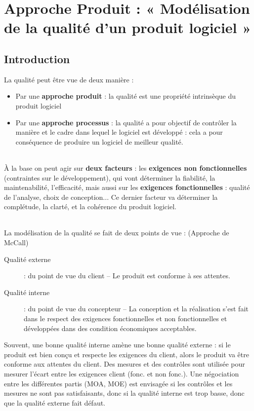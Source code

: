 \chapter{Approche Produit : « Modélisation de la qualité d’un produit logiciel »}

\section{Introduction}

La qualité peut être vue de deux manière :
\begin{itemize}
\item Par une \textbf{approche produit} : la qualité est une propriété intrinsèque du produit logiciel
\item Par une \textbf{approche processus} : la qualité a pour objectif de contrôler la manière et le cadre 	dans lequel le logiciel est développé : cela a pour conséquence de produire un logiciel de meilleur qualité.
\end{itemize}

\hfill\\

À la base on peut agir sur \textbf{deux facteurs} : les \textbf{exigences non fonctionnelles} (contraintes sur le développement), qui vont déterminer la fiabilité, la maintenabilité, l'efficacité, mais aussi sur les \textbf{exigences fonctionnelles} : qualité de l'analyse, choix de conception... Ce dernier facteur va déterminer la complétude, la clarté, et la cohérence du produit logiciel.

\hfill\\

La modélisation de la qualité se fait de deux points de vue : (Approche de McCall)
\begin{description}
\item[Qualité externe] : du point de vue du client – Le produit est conforme à ses attentes.
\item[Qualité interne] : du point  de vue du concepteur – La conception et la réalisation s'est fait dans le respect des exigences fonctionnelles et non fonctionnelles et développées dans des condition économiques acceptables.
\end{description}

Souvent, une bonne qualité interne amène une bonne qualité externe : si le produit est bien conçu et respecte les exigences du client, alors le produit va être conforme aux attentes du client. Des mesures et des contrôles sont utilisée pour mesurer l'écart entre les exigences client (fonc. et non fonc.). Une négociation entre les différentes partis (MOA, MOE) est envisagée si les contrôles et les mesures ne sont pas satisfaisants, donc si la qualité interne est trop basse, donc que la qualité externe fait défaut.


